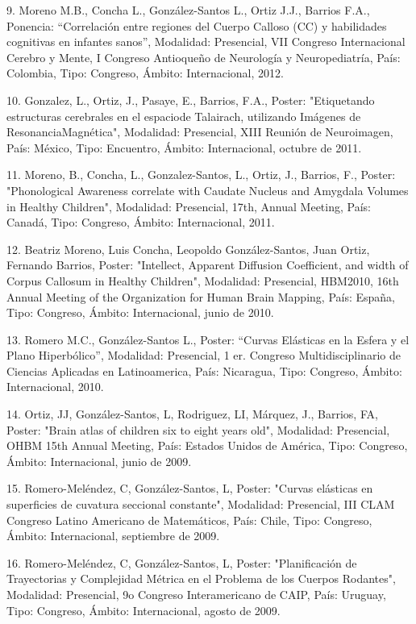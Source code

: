 9. Moreno M.B., Concha L., González-Santos L., Ortiz J.J., Barrios F.A., Ponencia: “Correlación 
entre regiones del Cuerpo Calloso (CC) y habilidades cognitivas en infantes sanos”, Modalidad: 
Presencial, VII Congreso Internacional Cerebro y Mente, I Congreso Antioqueño de Neurología y 
Neuropediatría, País: Colombia, Tipo: Congreso, Ámbito: Internacional, 2012.

10. Gonzalez, L., Ortiz, J., Pasaye, E., Barrios, F.A., Poster: "Etiquetando estructuras cerebrales 
en el espaciode Talairach, utilizando Imágenes de ResonanciaMagnética", Modalidad: Presencial, XIII 
Reunión de Neuroimagen, País: México, Tipo: Encuentro, Ámbito: Internacional, octubre de 2011.

11. Moreno, B., Concha, L., Gonzalez-Santos, L., Ortiz, J., Barrios, F., Poster: "Phonological 
Awareness correlate with Caudate Nucleus and Amygdala Volumes in Healthy Children", Modalidad: 
Presencial, 17th, Annual Meeting, País: Canadá, Tipo: Congreso, Ámbito: Internacional, 2011.

12. Beatriz Moreno, Luis Concha, Leopoldo González-Santos, Juan Ortiz, Fernando Barrios, Poster: 
"Intellect, Apparent Diffusion Coefficient, and width of Corpus Callosum in Healthy Children", 
Modalidad: Presencial, HBM2010, 16th Annual Meeting of the Organization for Human Brain Mapping, 
País: España, Tipo: Congreso, Ámbito: Internacional, junio de 2010.

13. Romero M.C., González-Santos L., Poster: “Curvas Elásticas en la Esfera y el Plano Hiperbólico”, 
Modalidad: Presencial, 1 er. Congreso Multidisciplinario de Ciencias Aplicadas en Latinoamerica, 
País: Nicaragua, Tipo: Congreso, Ámbito: Internacional, 2010.

14. Ortiz, JJ, González-Santos, L, Rodriguez, LI, Márquez, J., Barrios, FA, Poster: "Brain atlas of 
children six to eight years old", Modalidad: Presencial, OHBM 15th Annual Meeting, País: Estados 
Unidos de América, Tipo: Congreso, Ámbito: Internacional, junio de 2009.

15. Romero-Meléndez, C, González-Santos, L, Poster: "Curvas elásticas en superficies de cuvatura 
seccional constante", Modalidad: Presencial, III CLAM Congreso Latino Americano de Matemáticos, 
País: Chile, Tipo: Congreso, Ámbito: Internacional, septiembre de 2009.

16. Romero-Meléndez, C, González-Santos, L, Poster: "Planificación de Trayectorias y Complejidad 
Métrica en el Problema de los Cuerpos Rodantes", Modalidad: Presencial, 9o Congreso Interamericano 
de CAIP, País: Uruguay, Tipo: Congreso, Ámbito: Internacional, agosto de 2009.


